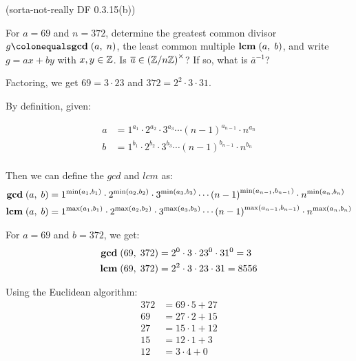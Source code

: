 \begin{problem}{\textsf{(sorta-not-really DF 0.3.15(b))}}
  \begin{enumalph}
  \item For $a=69$ and $n=372$,
  determine the greatest common divisor $g \colonequals \gcd{a}{n}$,
  the least common multiple $\mathbf{lcm}\;(a,\;b)$,
  and write $g=ax+by$ with $x,y \in \mathbb{Z}$.
  Is $\overline{a} \in {(\mathbb{Z}/n\mathbb{Z})}^\times$?  If so, what is $\overline{a}^{-1}$?
  \begin{Answer}
    Factoring, we get $69 = 3 \cdot 23$ and $372 = 2^2 \cdot 3 \cdot 31$.

    \noindent
    By definition, given:
    
    \begin{align*}
      a &= 1^{a_1} \cdot 2^{a_2} \cdot 3^{a_3} \cdots {(n-1)}^{a_{n-1}} \cdot n^{a_{n}} \\
      b &= 1^{b_1} \cdot 2^{b_2} \cdot 3^{b_3} \cdots {(n-1)}^{b_{n-1}} \cdot n^{b_{n}} \\
    \end{align*}

    \noindent
    Then we can define the $gcd$ and $lcm$ as:
    \begin{align*}
      \mathbf{gcd}\;(a,\;b) &= 1^{\min(a_1, b_1)} \cdot 2^{\min(a_2, b_2)} \cdot 3^{\min(a_3, b_3)} \cdots {(n-1)}^{\min(a_{n-1}, b_{n-1})} \cdot n^{\min(a_{n}, b_{n})} \\
      \mathbf{lcm}\;(a,\;b) &= 1^{\max(a_1, b_1)} \cdot 2^{\max(a_2, b_2)} \cdot 3^{\max(a_3, b_3)} \cdots {(n-1)}^{\max(a_{n-1}, b_{n-1})} \cdot n^{\max(a_{n}, b_{n})} \\
    \end{align*}

    \noindent
    For $a=69$ and $b=372$, we get:
    \begin{align*}
      \mathbf{gcd}\;(69,\;372) &= 2^0 \cdot 3 \cdot 23^0 \cdot 31^0 = 3 \\
      \mathbf{lcm}\;(69,\;372) &= 2^2 \cdot 3 \cdot 23 \cdot 31 = 8556 
    \end{align*}

    \noindent
    Using the Euclidean algorithm:
    \begin{align*}
      372 &= 69 \cdot 5 + 27 \\
      69 &= 27 \cdot 2 + 15 \\
      27 &= 15 \cdot 1 + 12 \\
      15 &= 12 \cdot 1 + 3 \\
      12 &= 3 \cdot 4 + 0
    \end{align*}


\end{Answer}
\end{enumalph}
\end{problem}
